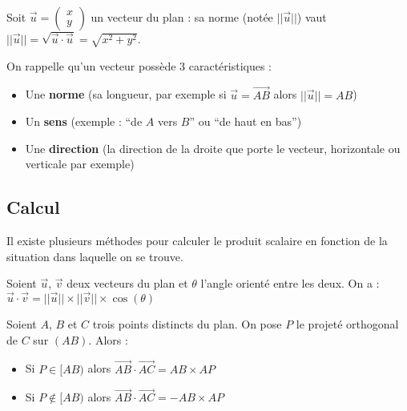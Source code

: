 	\begin{formula}
		Soit $\overrightarrow{u} = \begin{pmatrix} {x} \\ {y} \end{pmatrix}$ un vecteur du plan : sa norme (notée $||\overrightarrow{u}||$) vaut $||\overrightarrow{u}|| = \sqrt{\overrightarrow{u} \cdot \overrightarrow{u}} = \sqrt{x^2 + y^2}$.
	\end{formula}

	\begin{tip}
		On rappelle qu'un vecteur possède 3 caractéristiques :
		\begin{itemize}
			\item Une \textbf{norme} (sa longueur, par exemple si $\overrightarrow{u} = \overrightarrow{AB}$ alors $||\overrightarrow{u}|| = AB$)
			\item Un \textbf{sens} (exemple : ``de $A$ vers $B$'' ou ``de haut en bas'')
			\item Une \textbf{direction} (la direction de la droite que porte le vecteur, horizontale ou verticale par exemple)
		\end{itemize}
	\end{tip}

	\subsection{Calcul}

	Il existe plusieurs méthodes pour calculer le produit scalaire en fonction de la situation dans laquelle on se trouve.

	\begin{formula}
		Soient $\overrightarrow{u}$, $\overrightarrow{v}$ deux vecteurs du plan et $\theta$ l'angle orienté entre les deux. On a :
		\newpar
		$\overrightarrow{u} \cdot \overrightarrow{v} = ||\overrightarrow{u}|| \times ||\overrightarrow{v}|| \times \cos(\theta)$
	\end{formula}

	\begin{formula}
		Soient $A$, $B$ et $C$ trois points distincts du plan. On pose $P$ le projeté orthogonal de $C$ sur $(AB)$. Alors :
		\begin{itemize}
			\item Si $P \in [AB)$ alors $\overrightarrow{AB} \cdot \overrightarrow{AC} = AB \times AP$
			\item Si $P \notin [AB)$ alors $\overrightarrow{AB} \cdot \overrightarrow{AC} = - AB \times AP$
		\end{itemize}
	\end{formula}

